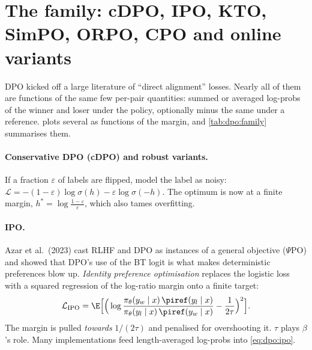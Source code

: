 \section{The family: cDPO, IPO, KTO, SimPO, ORPO, CPO and online variants}\label{sec:dpo:family}

DPO kicked off a large literature of ``direct alignment'' losses. Nearly all of them are
functions of the same few per-pair quantities: summed or averaged log-probs of the winner and
loser under the policy, optionally minus the same under a reference.  plots
several as functions of the margin, and \cref{tab:dpo:family} summarises them.

\paragraph{Conservative DPO (cDPO) and robust variants.} If a fraction $\varepsilon$ of labels are
flipped, model the label as noisy:
$\mathcal{L}=-(1-\varepsilon)\log\sigma(h)-\varepsilon\log\sigma(-h)$. The optimum is now at a finite
margin, $h^*=\log\frac{1-\varepsilon}{\varepsilon}$, which also tames overfitting.

\paragraph{IPO.} Azar et al.\ (2023) cast RLHF and DPO as instances of a general objective
($\Psi$PO) and showed that DPO's use of the BT logit is what makes deterministic preferences
blow up. \emph{Identity preference optimisation} replaces the logistic loss with a squared
regression of the log-ratio margin onto a finite target:
\begin{equation}
\mathcal{L}_{\text{IPO}}=\E\Big[\Big(\log\frac{\pi_\theta(y_w\mid x)\,\piref(y_l\mid x)}
{\pi_\theta(y_l\mid x)\,\piref(y_w\mid x)}-\frac{1}{2\tau}\Big)^2\Big].
\label{eq:dpo:ipo}
\end{equation}
The margin is pulled \emph{towards} $1/(2\tau)$ and penalised for overshooting it. $\tau$ plays
$\beta$'s role. Many implementations feed length-averaged log-probs into \eqref{eq:dpo:ipo}.

